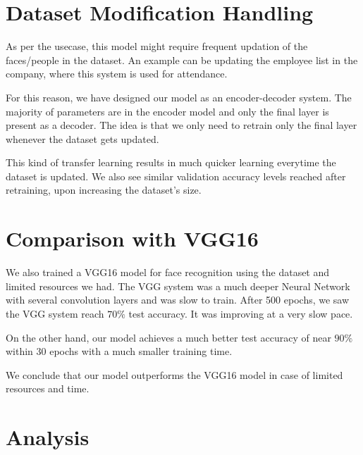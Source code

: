 \documentclass{article}
\begin{document}
\begin{sloppypar}
    
    \section{Dataset Modification Handling}

    As per the usecase, this model might require frequent updation of the faces/people in the dataset. An example can be updating the employee list in the company, where this system is used for attendance.

    For this reason, we have designed our model as an encoder-decoder system. The majority of parameters are in the encoder model and only the final layer is present as a decoder. The idea is that we only need to retrain only the final layer whenever the dataset gets updated.

    This kind of transfer learning results in much quicker learning everytime the dataset is updated. We also see similar validation accuracy levels reached after retraining, upon increasing the dataset's size.

    \section{Comparison with VGG16}

    We also trained a VGG16 model for face recognition using the dataset and limited resources we had. The VGG system was a much deeper Neural Network with several convolution layers and was slow to train. After 500 epochs, we saw the VGG system reach $70\%$ test accuracy. It was improving at a very slow pace.
    
    On the other hand, our model achieves a much better test accuracy of near $90\%$ within 30 epochs with a much smaller training time.

    We conclude that our model outperforms the VGG16 model in case of limited resources and time.


    \section{Analysis}


\end{sloppypar}
\end{document}
